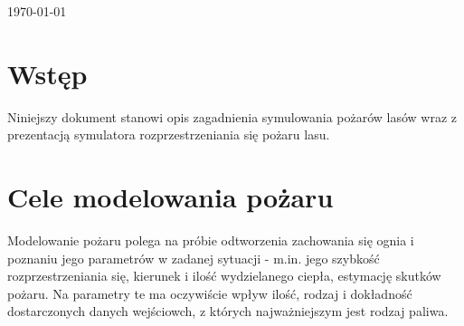 \documentclass[a4paper, 11pt]{article}
\begin{document}
\begin{titlepage}
		
		
		{\large \today}\\[3cm] %
		
		
		
		
		\vfill %
		
	\end{titlepage}
	
	
	\tableofcontents
	\vfill
	
	
	
	\section{Wstęp}
	\indent
	
	Niniejszy dokument stanowi opis zagadnienia symulowania pożarów lasów wraz z prezentacją symulatora rozprzestrzeniania się pożaru lasu.

	\section*{Cele modelowania pożaru}
	 \indent
	 
Modelowanie pożaru polega na próbie odtworzenia zachowania się ognia i poznaniu jego parametrów w zadanej sytuacji - m.in. jego szybkość rozprzestrzeniania się, kierunek i ilość wydzielanego ciepła, estymację skutków pożaru. Na parametry te ma oczywiście wpływ ilość, rodzaj i dokładność dostarczonych danych wejściowch, z których najważniejszym jest rodzaj paliwa. \\
\end{document}
